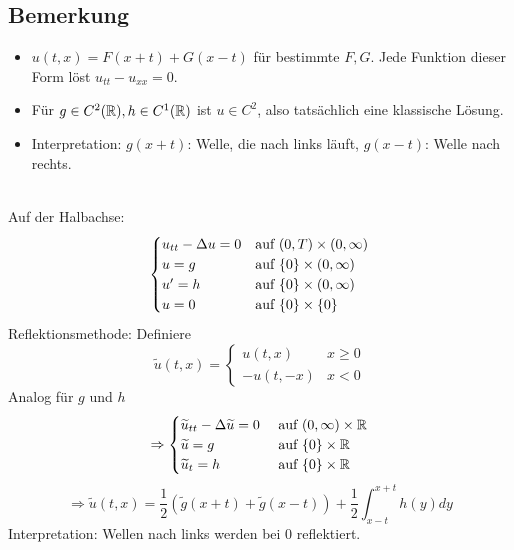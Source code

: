 \subsection{Bemerkung}
	\begin{itemize}
		\item $u(t,x) = F(x+t) + G(x-t)$ für bestimmte $F,G$. Jede Funktion dieser Form löst $u_{tt}-u_{xx} = 0$.
		\item Für $g \in C^2(\mathbb{R}), h \in C^1(\mathbb{R})$ ist $u \in C^2$, also tatsächlich eine klassische Lösung.
		\item Interpretation: $g(x+t)$: Welle, die nach links läuft, $g(x-t)$: Welle nach rechts.
	\end{itemize}
	
\mbox{} \\
Auf der Halbachse:
	\[ \begin{cases}
	u_{tt} - \Delta u = 0	&	\text{auf } (0,T) \times (0,\infty)	\\
	u = g	&	\text{auf } \{0\} \times (0,\infty)	\\
	u' = h	&	\text{auf } \{0\} \times (0,\infty) \\
	u = 0 & \text{auf } \{0\} \times \{0\}
	\end{cases} \]
Reflektionsmethode: Definiere
\[ \widetilde{u}(t,x) = \begin{cases}
	u(t,x) & x \geq 0 \\
	-u(t,-x) & x < 0 \end{cases} \]
Analog für $g$ und $h$
\[ \Rightarrow \begin{cases}
	\widetilde{u}_{tt} - \Delta \widetilde{u} = 0 & \text{ auf } (0,\infty) \times \mathbb{R} \\
	\widetilde{u} = g & \text{ auf } \{0\} \times \mathbb{R} \\
	\widetilde{u}_t = h & \text{ auf } \{0\} \times \mathbb{R} \end{cases} \]
\[ \Rightarrow \widetilde{u}(t,x) = \frac{1}{2} (\widetilde{g}(x+t) + \widetilde{g}(x-t)) + \frac{1}{2} \int_{x-t}^{x+t} h(y) dy \]
Interpretation: Wellen nach links werden bei 0 reflektiert.
\newpage